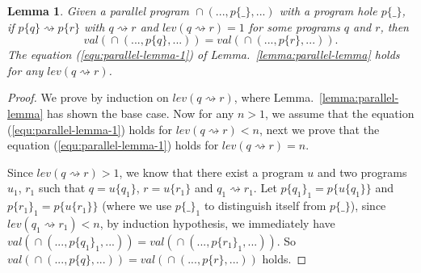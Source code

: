 \documentclass{fcs}
\newtheorem{lemma}{Lemma}[section]
\newcommand{\val}[0]{\mathit{val}}
\DeclareMathOperator{\para}{\cap}
\newcommand{\place}[0]{\_}
\newcommand{\red}[0]{\rightsquigarrow}
\newcommand{\lev}[0]{\mathit{lev}}
\begin{document}
\begin{lemma}
    \ifx
    \label{lemma:parallel-lemma-2}
    Given a parallel program $\para(...,p\{\place\},...)$ with a program hole $p\{\place\}$,
    if $p\{q\}\red p\{r\}$ with $q\red r$ and $\lev(q\red r) = 1$ for some programs $q$ and $r$,
    then
    \begin{equation}
    \label{equ:parallel-lemma-2}
    \val(\para(..., p\{q\},...)) = \val(\para(...,p\{r\},...)).
    \end{equation}
    \fi
    \label{lemma:parallel-lemma-2}
    The equation (\ref{equ:parallel-lemma-1}) of Lemma.~\ref{lemma:parallel-lemma} holds for any $\lev(q\red r)$.
\end{lemma}

\begin{proof}
    We prove by induction on $\lev(q\red r)$, where Lemma.~\ref{lemma:parallel-lemma} has shown the base case.
    Now for any $n>1$, we assume that the equation (\ref{equ:parallel-lemma-1}) holds for $\lev(q\red r)<n$,
    next we prove that the equation (\ref{equ:parallel-lemma-1}) holds for $\lev(q\red r) = n$.

    Since $\lev(q\red r) >1$, we know that there exist a program $u$ and two programs $u_1$, $r_1$ such that $q = u\{q_1\}$, $r = u\{r_1\}$ and $q_1\red r_1$.
    Let $p\{q_1\}_1 = p\{u\{q_1\}\}$ and $p\{r_1\}_1 = p\{u\{r_1\}\}$ (where we use $p\{\place\}_1$ to distinguish itself from $p\{\place\}$),
    since $\lev(q_1\red r_1) < n$, by induction hypothesis, we immediately have $\val(\para(...,p\{q_1\}_1,...)) = \val(\para(...,p\{r_1\}_1,...))$.
    So $\val(\para(...,p\{q\},...)) = \val(\para(...,p\{r\},...))$ holds.

\end{proof}
\end{document}
